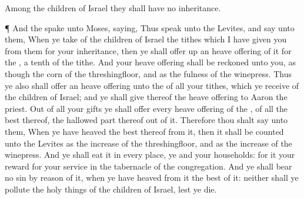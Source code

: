 {Among the
children of
Israel they shall
have no
inheritance.
\par }{\PP {}¶ And the
{}
spake unto
Moses,
saying,
Thus
speak unto the
Levites, and
say unto them, When ye
take of the
children of
Israel the
tithes which I have
given you from them for your
inheritance, then ye shall
offer up an heave
offering of it for the
{},
{} a
tenth
{} of the
tithe.
And
{} your heave
offering shall be
reckoned unto you, as though
{} the
corn of the
threshingfloor, and as the
fulness of the
winepress.
Thus ye also shall
offer an heave
offering unto the
{} of all your
tithes, which ye
receive of the
children of
Israel; and ye shall
give thereof the
{} heave
offering to
Aaron the
priest.
Out of all your
gifts ye shall
offer every heave
offering of the
{}, of all the
best thereof,
{} the hallowed
part thereof out of it.
Therefore thou shalt
say unto them, When ye have
heaved the
best thereof from it, then it shall be
counted unto the
Levites as the
increase of the
threshingfloor, and as the
increase of the
winepress.
And ye shall
eat it in every
place, ye and your
households: for it
{} your
reward
for your
service in the
tabernacle of the
congregation.
And ye shall
bear no
sin by reason of it, when ye have
heaved from it the
best of it: neither shall ye
pollute the holy
things of the
children of
Israel, lest ye
die.

}
